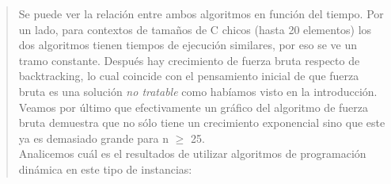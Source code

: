 \documentclass[7pt,a4paper]{article}
\begin{document}
\begin{verse}
\begin{center}
\end{center}
Se puede ver la relación entre ambos algoritmos en función del tiempo. Por un lado, para contextos de tamaños de C chicos (hasta 20 elementos) los dos algoritmos tienen tiempos de ejecución similares, por eso se ve un tramo constante. Después hay crecimiento de fuerza bruta respecto de backtracking, lo cual coincide con el pensamiento inicial de que fuerza bruta es una solución {\it no tratable} como habíamos visto en la introducción. %
Veamos por último que efectivamente un gráfico del algoritmo de fuerza bruta demuestra que no sólo tiene un crecimiento exponencial sino que este ya es demasiado grande para n $\geq$ 25.
\\
Analicemos cuál es el resultados de utilizar algoritmos de programación dinámica en este tipo de instancias:

\end{verse}
\end{document}
